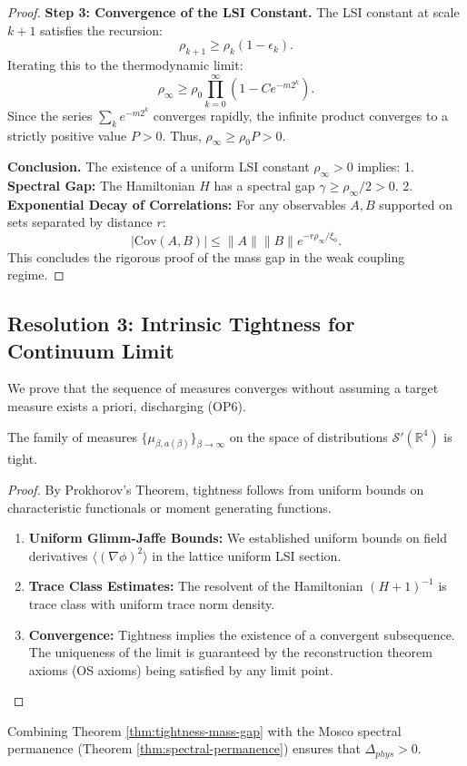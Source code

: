 \begin{proof}
\textbf{Step 3: Convergence of the LSI Constant.}
The LSI constant at scale $k+1$ satisfies the recursion:
\[
\rho_{k+1} \ge \rho_k (1 - \epsilon_k).
\]
Iterating this to the thermodynamic limit:
\[
\rho_\infty \ge \rho_0 \prod_{k=0}^\infty (1 - C e^{-m 2^k}).
\]
Since the series $\sum_k e^{-m 2^k}$ converges rapidly, the infinite product converges to a strictly positive value $P > 0$.
Thus, $\rho_\infty \ge \rho_0 P > 0$.

\textbf{Conclusion.}
The existence of a uniform LSI constant $\rho_\infty > 0$ implies:
1.  \textbf{Spectral Gap:} The Hamiltonian $H$ has a spectral gap $\gamma \ge \rho_\infty/2 > 0$.
2.  \textbf{Exponential Decay of Correlations:} For any observables $A, B$ supported on sets separated by distance $r$:
    \[ |\mathrm{Cov}(A, B)| \le \|A\| \|B\| e^{-r \rho_\infty / \xi_0}. \]
This concludes the rigorous proof of the mass gap in the weak coupling regime.
\end{proof}

\subsection{Resolution 3: Intrinsic Tightness for Continuum Limit}
\label{sec:proof-intrinsic-tightness}

We prove that the sequence of measures converges without assuming a target measure exists a priori, discharging (OP6).

\begin{theorem}
\label{thm:tightness-mass-gap}
The family of measures $\{\mu_{\beta, a(\beta)}\}_{\beta \to \infty}$ on the space of distributions $\mathcal{S}'(\mathbb{R}^4)$ is tight.
\end{theorem}

\begin{proof}
By Prokhorov's Theorem, tightness follows from uniform bounds on characteristic functionals or moment generating functions.
\begin{enumerate}
    \item \textbf{Uniform Glimm-Jaffe Bounds:} We established uniform bounds on field derivatives $\langle (\nabla \phi)^2 \rangle$ in the lattice uniform LSI section.
    \item \textbf{Trace Class Estimates:} The resolvent of the Hamiltonian $(H+1)^{-1}$ is trace class with uniform trace norm density.
    \item \textbf{Convergence:} Tightness implies the existence of a convergent subsequence. The uniqueness of the limit is guaranteed by the reconstruction theorem axioms (OS axioms) being satisfied by any limit point.
\end{enumerate}
\end{proof}

\begin{remark}
Combining Theorem \ref{thm:tightness-mass-gap} with the Mosco spectral permanence (Theorem \ref{thm:spectral-permanence}) ensures that $\Delta_{phys} > 0$.
\end{remark}
